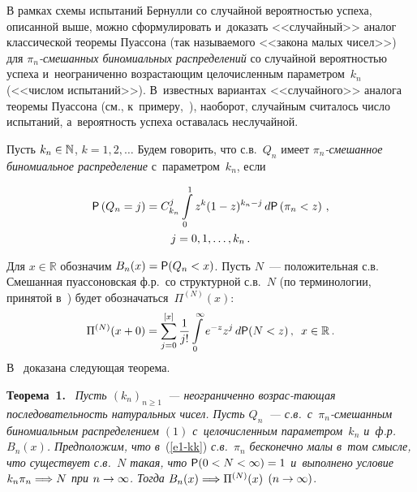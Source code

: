 \begin{multicols}{2}
В рамках схемы испытаний Бернулли со случайной вероятностью успеха,
описанной выше, можно сформулировать и~доказать <<случайный>> аналог
классической теоремы Пуассона (так называемого <<закона малых
чисел>>) для \textit{$\pi_n$-сме\-шан\-ных биномиальных распределений} со
случайной ве\-ро\-ят\-ностью успеха и~неограниченно возрастающим
це\-ло\-чис\-лен\-ным параметром~$k_n$ (<<чис\-лом испытаний>>). В~известных
вариантах <<случайного>> аналога тео\-ре\-мы Пуассона (см., 
к~примеру,~\cite{KorolevBeningShorgin2011}), наоборот, случайным считалось число
испытаний, а~вероятность успеха оставалась неслучайной.

Пусть $k_n\hm\in\mathbb{N}$, $k=1,2,\ldots$ Будем говорить, что с.в.~$Q_n$ 
имеет \textit{$\pi_n$-сме\-шан\-ное биномиальное распределение} 
с~параметром~$k_n$, если

\vspace*{-2pt} 

\noindent
\begin{multline}
 {\sf P}\left(Q_n=j\right)=C_{k_n}^j\int\limits_{0}^{1}z^k(1-z)^{k_n-j}\,
d{\sf P}\left(\pi_n<z\right)\,,\\ j=0,1,\ldots,k_n\,.
\label{e1-kk}
\end{multline}

\vspace*{-2pt}

\noindent
Для $x\in\mathbb{R}$ обозначим $B_n(x)\hm={\sf P}(Q_n\hm<x)$. Пусть $N$~---
положительная с.в. Смешанная пуассоновская ф.р.\ со структурной с.в.~$N$ 
(по терминологии, принятой в~\cite{Grandell1997}) будет
обозначаться~$\Pi^{(N)}(x)$:
$$
\Pi^{(N)}(x+0)=\sum\limits_{j=0}^{[x]}\displaystyle\frac{\displaystyle 1\mathstrut}{\displaystyle j!\mathstrut}\int\limits_{0}^{\infty}e^{-z}z^j\,
d{\sf P}(N<z)\,,\enskip x\in\mathbb{R}\,.
$$
В~\cite{KorolevKorchaginZeifman2017} доказана следующая теорема.

\smallskip

\noindent
\textbf{Теорема~1.}\ %
\textit{Пусть
$(k_n)_{n\ge1}$~--- неограниченно возрас-\linebreak тающая последовательность
натуральных чисел. Пусть $Q_n$~--- с.в.\ с~$\pi_n$-сме\-шан\-ным
биномиальным распределением $(1)$ с~целочисленным параметром~$k_n$ 
и~ф.р.~$B_n(x)$. Предположим, что в}~(\ref{e1-kk}) \textit{с.в.~$\pi_n$ бесконечно
малы в~том смысле, что существует с.в.~$N$ такая, что ${\sf P}
(0\hm< N\hm<\infty)\hm=1$ и~выполнено условие $k_n\pi_n\hm\Longrightarrow N$ при
$n\hm\to\infty$. Тогда} $B_n(x)\hm\Longrightarrow \Pi^{(N)}(x)$
$(n\hm\to\infty)$.


\end{multicols}
